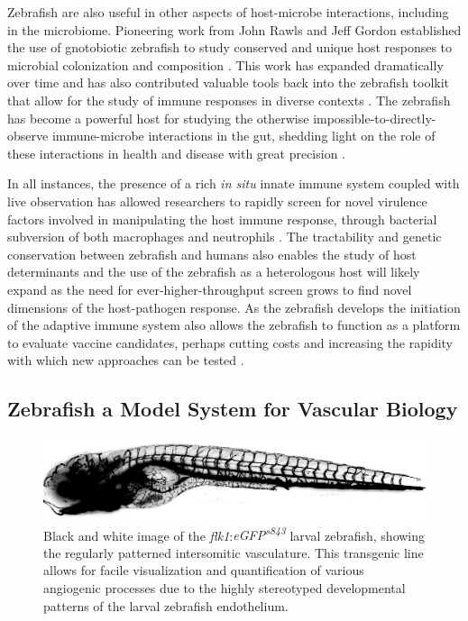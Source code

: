 Zebrafish are also useful in other aspects of host-microbe interactions, including in the microbiome. Pioneering work from John Rawls and Jeff Gordon established the use of gnotobiotic zebrafish to study conserved and unique host responses to microbial colonization and composition \citep{Rawls2004, Rawls2006}. This work has expanded dramatically over time and has also contributed valuable tools back into the zebrafish toolkit that allow for the study of immune responses in diverse contexts \citep{Kanther2011}. The zebrafish has become a powerful host for studying the otherwise impossible-to-directly-observe immune-microbe interactions in the gut, shedding light on the role of these interactions in health and disease with great precision \citep{Park2019, Murdoch2019a, Murdoch2019b, Espenschied2019}.

In all instances, the presence of a rich \textit{in situ} innate immune system coupled with live observation has allowed researchers to rapidly screen for novel virulence factors involved in manipulating the host immune response, through bacterial subversion of both macrophages and neutrophils \citep{Torraca2018}. The tractability and genetic conservation between zebrafish and humans also enables the study of host determinants and the use of the zebrafish as a heterologous host will likely expand as the need for ever-higher-throughput screen grows to find novel dimensions of the host-pathogen response. As the zebrafish develops the initiation of the adaptive immune system also allows the zebrafish to function as a platform to evaluate vaccine candidates, perhaps cutting costs and increasing the rapidity with which new approaches can be tested \citep{Myllymaki2017}.

\subsection{Zebrafish a Model System for Vascular Biology}\label{zfvasc}

\begin{figure}
\begin{center}
\includegraphics[width=\textwidth]{images/flk1gfp.png}
\caption{Black and white image of the \textit{flk1}:\textit{eGFP\textsuperscript{s843}} larval zebrafish, showing the regularly patterned intersomitic vasculature. This transgenic line allows for facile visualization and quantification of various angiogenic processes due to the highly stereotyped developmental patterns of the larval zebrafish endothelium.}
\label{figure:flk1}
\end{center}
\end{figure}

